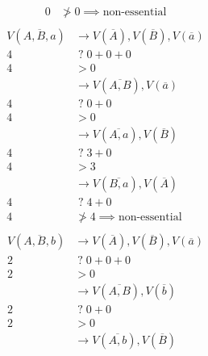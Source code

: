 \documentclass{article}
\newcommand*{\unknown}[0]{\;?\;}
\begin{document}
\begin{enumerate}
\begin{enumerate}
\begin{align*}
    0                  &\not>       0                  \implies \text{non-essential} \\
    \end{align*}
    \begin{align*}
    V(\overline{A, B, a}) &\rightarrow V(\overline{A}), V(\overline{B}), V(\overline{a}) \\
    4                     &\unknown    0              + 0              + 0 \\
    4                     &>           0                                   \\
                          &\rightarrow V(\overline{A, B}), V(\overline{a}) \\
    4                     &\unknown    0              + 0                  \\
    4                     &>           0                                   \\
                          &\rightarrow V(\overline{A, a}), V(\overline{B}) \\
    4                     &\unknown    3              + 0                  \\
    4                     &>           3                                   \\
                          &\rightarrow V(\overline{B, a}), V(\overline{A}) \\
    4                     &\unknown    4              + 0                  \\
    4                     &\not>       4                                   \implies \text{non-essential} \\
    \end{align*}
    \begin{align*}
    V(\overline{A, B, b}) &\rightarrow V(\overline{A}), V(\overline{B}), V(\overline{a}) \\
    2                     &\unknown    0              + 0              + 0 \\
    2                     &>           0                                   \\
                          &\rightarrow V(\overline{A, B}), V(\overline{b}) \\
    2                     &\unknown    0              + 0                  \\
    2                     &>           0                                   \\
                          &\rightarrow V(\overline{A, b}), V(\overline{B}) \\

\end{align*}
\end{enumerate}
\end{enumerate}
\end{document}
